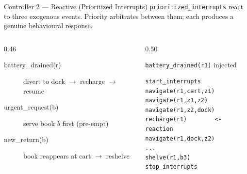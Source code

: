 \documentclass{beamer}
\begin{document}
\begin{frame}[fragile]{Controller 2 --- Reactive (Prioritized Interrupts)}
\texttt{prioritized\_interrupts} react to three exogenous events. Priority
arbitrates between them; each produces a genuine behavioural response.

\vspace{0.1em}
\begin{columns}
\begin{column}{0.46\textwidth}
\begin{description}
  \item[battery\_drained(r)] divert to dock $\to$ recharge $\to$ resume
  \item[urgent\_request(b)] serve book $b$ first (pre-empt)
  \item[new\_return(b)] book reappears at cart $\to$ reshelve
\end{description}
\end{column}
\begin{column}{0.50\textwidth}
\begin{block}{\texttt{battery\_drained(r1)} injected}
\begin{lstlisting}[basicstyle=\ttfamily\footnotesize]
start_interrupts
navigate(r1,cart,z1)
navigate(r1,z1,z2)
navigate(r1,z2,dock)
recharge(r1)        <- reaction
navigate(r1,dock,z2)
...
shelve(r1,b3)
stop_interrupts
\end{lstlisting}
\end{block}
\end{column}
\end{columns}
\end{frame}
\end{document}

